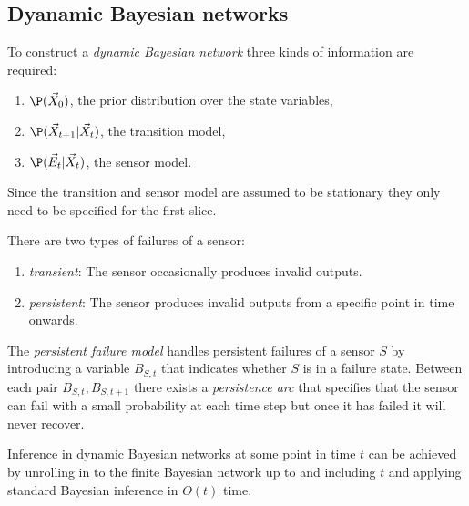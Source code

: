 \documentclass{article}
\begin{document}
\subsection{Dyanamic Bayesian networks}

\begin{definition}
    To construct a \emph{dynamic Bayesian network} three kinds of information
    are required:
    \begin{enumerate}
        \item $\P(\vec X_0)$, the prior distribution over the state variables,
        \item $\P(\vec X_{t+1}|\vec X_t)$, the transition model,
        \item $\P(\vec E_t | \vec X_t)$, the sensor model.
    \end{enumerate}
    Since the transition and sensor model are assumed to be stationary they only
    need to be specified for the first slice.
\end{definition}

\begin{definition}
    There are two types of failures of a sensor:
    \begin{enumerate}
        \item \emph{transient}: The sensor occasionally produces invalid outputs.
        \item \emph{persistent}: The sensor produces invalid outputs from a specific point in time onwards.
    \end{enumerate}
\end{definition}

\begin{definition}
    The \emph{persistent failure model} handles persistent failures of a sensor $S$ by introducing
    a variable $B_{S,t}$ that indicates whether $S$ is in a failure state. Between each pair
    $B_{S,t}, B_{S,t+1}$ there exists a \emph{persistence arc} that specifies that the sensor can
    fail with a small probability at each time step but once  it has failed it will never recover.
\end{definition}

\begin{theorem}
    Inference in dynamic Bayesian networks at some point in time $t$ can be achieved by unrolling
    in to the finite Bayesian network up to and including $t$ and applying standard Bayesian 
    inference in $O(t)$ time.
\end{theorem}
\end{document}
